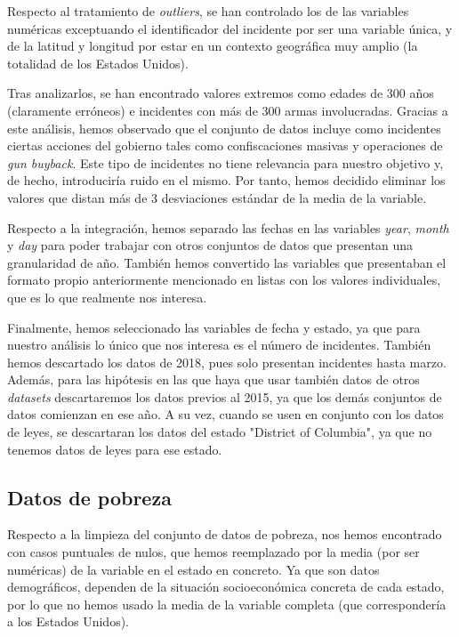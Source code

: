 \documentclass[11pt,a4paper]{article}
\begin{document}
Respecto al tratamiento de \textit{outliers}, se han controlado los de las variables numéricas exceptuando el identificador del incidente por ser una variable única, y de la latitud y longitud por estar en un contexto geográfica muy amplio (la totalidad de los Estados Unidos).

Tras analizarlos, se han encontrado valores extremos como edades de 300 años (claramente erróneos) e incidentes con más de 300 armas involucradas. Gracias a este análisis, hemos observado que el conjunto de datos incluye como incidentes ciertas acciones del gobierno tales como confiscaciones masivas y operaciones de \textit{gun buyback}. Este tipo de incidentes no tiene relevancia para nuestro objetivo y, de hecho, introduciría ruido en el mismo. Por tanto, hemos decidido eliminar los valores que distan más de 3 desviaciones estándar de la media de la variable.

Respecto a la integración, hemos separado las fechas en las variables \textit{year}, \textit{month} y \textit{day} para poder trabajar con otros conjuntos de datos que presentan una granularidad de año. También hemos convertido las variables que presentaban el formato propio anteriormente mencionado en listas con los valores individuales, que es lo que realmente nos interesa.

Finalmente, hemos seleccionado las variables de fecha y estado, ya que para nuestro análisis lo único que nos interesa es el número de incidentes. También hemos descartado los datos de 2018, pues solo presentan incidentes hasta marzo. Además, para las hipótesis en las que haya que usar también datos de otros \textit{datasets} descartaremos los datos previos al 2015, ya que los demás conjuntos de datos comienzan en ese año. A su vez, cuando se usen en conjunto con los datos de leyes, se descartaran los datos del estado "District of Columbia", ya que no tenemos datos de leyes para ese estado.

\subsection{Datos de pobreza}

Respecto a la limpieza del conjunto de datos de pobreza, nos hemos encontrado con casos puntuales de nulos, que hemos reemplazado por la media (por ser numéricas) de la variable en el estado en concreto. Ya que son datos demográficos, dependen de la situación socioeconómica concreta de cada estado, por lo que no hemos usado la media de la variable completa (que correspondería a los Estados Unidos).
\end{document}
